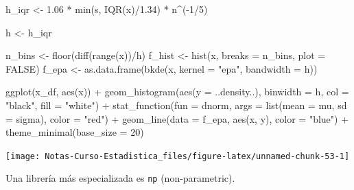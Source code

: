 \documentclass[
  12pt,
]{book}
\newenvironment{Shaded}{\begin{snugshade}}{\end{snugshade}}
\newcommand{\AttributeTok}[1]{\textcolor[rgb]{0.77,0.63,0.00}{#1}}
\newcommand{\ConstantTok}[1]{\textcolor[rgb]{0.00,0.00,0.00}{#1}}
\newcommand{\DecValTok}[1]{\textcolor[rgb]{0.00,0.00,0.81}{#1}}
\newcommand{\FloatTok}[1]{\textcolor[rgb]{0.00,0.00,0.81}{#1}}
\newcommand{\FunctionTok}[1]{\textcolor[rgb]{0.00,0.00,0.00}{#1}}
\newcommand{\NormalTok}[1]{#1}
\newcommand{\OtherTok}[1]{\textcolor[rgb]{0.56,0.35,0.01}{#1}}
\newcommand{\SpecialCharTok}[1]{\textcolor[rgb]{0.00,0.00,0.00}{#1}}
\newcommand{\StringTok}[1]{\textcolor[rgb]{0.31,0.60,0.02}{#1}}
\begin{document}
\begin{Shaded}
\begin{Highlighting}[]
\NormalTok{h\_iqr }\OtherTok{\textless{}{-}} \FloatTok{1.06} \SpecialCharTok{*} \FunctionTok{min}\NormalTok{(s, }\FunctionTok{IQR}\NormalTok{(x)}\SpecialCharTok{/}\FloatTok{1.34}\NormalTok{) }\SpecialCharTok{*}\NormalTok{ n}\SpecialCharTok{\^{}}\NormalTok{(}\SpecialCharTok{{-}}\DecValTok{1}\SpecialCharTok{/}\DecValTok{5}\NormalTok{)}

\NormalTok{h }\OtherTok{\textless{}{-}}\NormalTok{ h\_iqr}

\NormalTok{n\_bins }\OtherTok{\textless{}{-}} \FunctionTok{floor}\NormalTok{(}\FunctionTok{diff}\NormalTok{(}\FunctionTok{range}\NormalTok{(x))}\SpecialCharTok{/}\NormalTok{h)}
\NormalTok{f\_hist }\OtherTok{\textless{}{-}} \FunctionTok{hist}\NormalTok{(x, }\AttributeTok{breaks =}\NormalTok{ n\_bins, }\AttributeTok{plot =} \ConstantTok{FALSE}\NormalTok{)}
\NormalTok{f\_epa }\OtherTok{\textless{}{-}} \FunctionTok{as.data.frame}\NormalTok{(}\FunctionTok{bkde}\NormalTok{(x, }\AttributeTok{kernel =} \StringTok{"epa"}\NormalTok{, }\AttributeTok{bandwidth =}\NormalTok{ h))}

\FunctionTok{ggplot}\NormalTok{(x\_df, }\FunctionTok{aes}\NormalTok{(x)) }\SpecialCharTok{+} \FunctionTok{geom\_histogram}\NormalTok{(}\FunctionTok{aes}\NormalTok{(}\AttributeTok{y =}\NormalTok{ ..density..),}
    \AttributeTok{binwidth =}\NormalTok{ h, }\AttributeTok{col =} \StringTok{"black"}\NormalTok{, }\AttributeTok{fill =} \StringTok{"white"}\NormalTok{) }\SpecialCharTok{+}
    \FunctionTok{stat\_function}\NormalTok{(}\AttributeTok{fun =}\NormalTok{ dnorm, }\AttributeTok{args =} \FunctionTok{list}\NormalTok{(}\AttributeTok{mean =}\NormalTok{ mu,}
        \AttributeTok{sd =}\NormalTok{ sigma), }\AttributeTok{color =} \StringTok{"red"}\NormalTok{) }\SpecialCharTok{+} \FunctionTok{geom\_line}\NormalTok{(}\AttributeTok{data =}\NormalTok{ f\_epa,}
    \FunctionTok{aes}\NormalTok{(x, y), }\AttributeTok{color =} \StringTok{"blue"}\NormalTok{) }\SpecialCharTok{+} \FunctionTok{theme\_minimal}\NormalTok{(}\AttributeTok{base\_size =} \DecValTok{20}\NormalTok{)}
\end{Highlighting}
\end{Shaded}

\begin{center}\texttt{[image: Notas-Curso-Estadistica\_files/figure-latex/unnamed-chunk-53-1]} \end{center}

Una librería más especializada es \texttt{np} (non-parametric).
\end{document}
